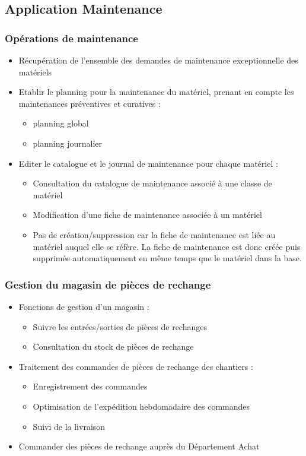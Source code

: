 \documentclass [a4paper] {report}
\begin{document}
\subsection{Application Maintenance}
\subsubsection{Opérations de maintenance}
\begin{itemize}
\item Récupération de l'ensemble des demandes de maintenance exceptionnelle
des matériels
\item Etablir le planning pour la maintenance du matériel, prenant en
compte les maintenances préventives et curatives :
    \begin{itemize}
    \item planning global
    \item planning journalier
    \end{itemize}
\item Editer le catalogue et le  journal de maintenance pour chaque matériel :
    \begin{itemize}
    \item Consultation du catalogue de maintenance associé à une classe de 
    matériel
    \item Modification d'une fiche de maintenance associée à un matériel
    \item Pas de création/suppression car la fiche de maintenance est liée
    au matériel auquel elle se réfère. La fiche de maintenance est donc
    créée puis supprimée automatiquement en même temps que le matériel dans
    la base.
    \end{itemize}
\end{itemize}

\subsubsection{Gestion du magasin de pièces de rechange}
\begin{itemize}
\item Fonctions de gestion d'un magasin :
    \begin{itemize}
    \item Suivre les entrées/sorties de pièces de rechanges
    \item Consultation du stock de pièces de rechange
    \end{itemize}
\item Traitement des commandes de pièces de rechange des chantiers :
    \begin{itemize}
    \item Enregistrement des commandes
    \item Optimisation de l'expédition hebdomadaire des commandes
    \item Suivi de la livraison 
    \end{itemize}
\item Commander des pièces de rechange auprès du Département Achat
\end{itemize}
\end{document}
